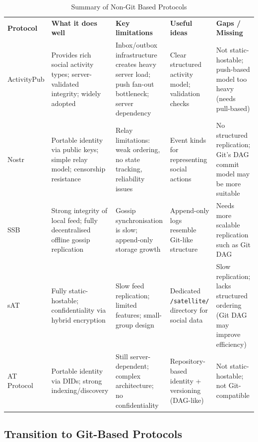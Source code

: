 \begin{table}[h]
\centering
\caption{Summary of Non-Git Based Protocols}
\label{tab:non_git_summary}
\begin{tabular}{p{2.5cm} p{4cm} p{4cm} p{4cm} p{4cm}}
\textbf{Protocol} &
\textbf{What it does well} &
\textbf{Key limitations} &
\textbf{Useful ideas} &
\textbf{Gaps / Missing} \\

ActivityPub &
Provides rich social activity types; server-validated integrity; widely adopted &
Inbox/outbox infrastructure creates heavy server load; push fan-out bottleneck; server dependency &
Clear structured activity model; validation checks &
Not static-hostable; push-based model too heavy (needs pull-based) \\

Nostr &
Portable identity via public keys; simple relay model; censorship resistance &
Relay limitations: weak ordering, no state tracking, reliability issues &
Event kinds for representing social actions &
No structured replication; Git’s DAG commit model may be more suitable \\

SSB &
Strong integrity of local feed; fully decentralised offline gossip replication &
Gossip synchronisation is slow; append-only storage growth &
Append-only logs resemble Git-like structure &
Needs more scalable replication such as Git DAG \\

sAT &
Fully static-hostable; confidentiality via hybrid encryption &
Slow feed replication; limited features; small-group design &
Dedicated \texttt{/satellite/} directory for social data &
Slow replication; lacks structured ordering (Git DAG may improve efficiency) \\

AT Protocol &
Portable identity via DIDs; strong indexing/discovery &
Still server-dependent; complex architecture; no confidentiality &
Repository-based identity + versioning (DAG-like) &
Not static-hostable; not Git-compatible \\
\end{tabular}
\end{table}
\subsection*{Transition to Git-Based Protocols}

